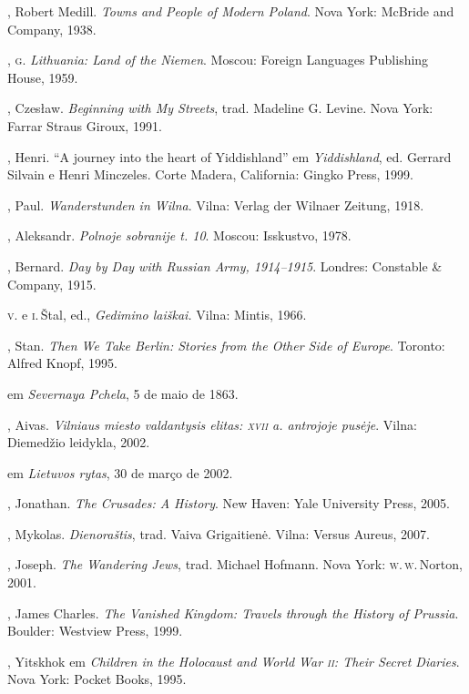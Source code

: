 \begin{bibliohedra}
  , Robert Medill. \textit{Towns and People of Modern Poland}. Nova
  York: McBride and Company, 1938.

  , \textsc{g}. \textit{Lithuania: Land of the Niemen}. Moscou: Foreign
  Languages Publishing House, 1959.

  , Czesław. \textit{Beginning with My Streets}, trad. Madeline G.
  Levine. Nova York: Farrar Straus Giroux, 1991.

  , Henri. ``A journey into the heart of Yiddishland'' em
  \textit{Yiddishland}, ed. Gerrard Silvain e Henri Minczeles. Corte
  Madera, California: Gingko Press, 1999.

  , Paul. \textit{Wanderstunden in Wilna}. Vilna: Verlag der Wilnaer
  Zeitung, 1918.

  , Aleksandr. \textit{Polnoje sobranije t. 10}. Moscou: Isskustvo, 1978.

  , Bernard. \textit{Day by Day with Russian Army, 1914--1915}.
  Londres: Constable \& Company, 1915.

   \textsc{v}. e \textsc{i}.\,Štal, ed., \textit{Gedimino laiškai.} Vilna: Mintis,
  1966.

  , Stan. \textit{Then We Take Berlin: Stories from the Other Side
  of Europe}. Toronto: Alfred Knopf, 1995.

   em \textit{Severnaya Pchela}, 5 de maio de 1863.

  , Aivas. \textit{Vilniaus miesto valdantysis elitas: \textsc{xvii} a.
  antrojoje pusėje}. Vilna: Diemedžio leidykla, 2002.

   em \textit{Lietuvos rytas},
  30 de março de 2002.

  , Jonathan. \textit{The Crusades: A History}. New Haven: Yale
  University Press, 2005.

  , Mykolas. \textit{Dienoraštis}, trad. Vaiva Grigaitienė.
  Vilna: Versus Aureus, 2007.

  , Joseph. \textit{The Wandering Jews}, trad. Michael Hofmann. Nova
  York: \textsc{w.\,w.}\,Norton, 2001.

  , James Charles. \textit{The Vanished Kingdom: Travels through the
  History of Prussia}. Boulder: Westview Press, 1999.

  , Yitskhok em \textit{Children in the Holocaust and World
  War \textsc{ii}: Their Secret Diaries}. Nova York: Pocket
  Books, 1995.


\end{bibliohedra}
